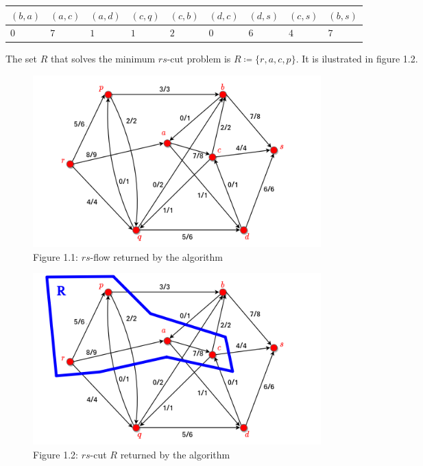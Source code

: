 \documentclass[a4paper,10pt, leqno]{article}
\theoremstyle{definition}
\begin{document}
\bgroup
\def\arraystretch{1.8}
\begin{center}
\begin{tabular}{|m{0.8cm}|m{0.8cm}|m{0.8cm}|m{0.8cm}|m{0.8cm}|m{0.8cm}|m{0.8cm}|m{0.8cm}|m{0.8cm}|}
\hline 
$(b, a)$
& $(a, c)$
& $(a, d)$
& $(c, q)$
& $(c, b)$
& $(d, c)$
& $(d, s)$
& $(c, s)$
& $(b, s)$
\\ \hline
\centering $0$
& \centering $7$
& \centering $1$
& \centering $1$
& \centering $2$
& \centering $0$
& \centering $6$
& \centering $4$
& \centering\arraybackslash $7$
\\ \hline
\end{tabular}
\end{center}
\egroup

The set $R$ that solves the minimum $rs$-cut problem is $R \coloneqq \{r, a, c, p \}$. It is ilustrated in figure 1.2.

\begin{figure}[ht]
\centering
  \includegraphics[width=30em]{flow.png}
  \captionsetup{labelformat=empty}
  \caption{Figure 1.1: $rs$-flow returned by the algorithm}
\end{figure}
\begin{figure}[ht]
\centering
  \includegraphics[width=30em]{cut.png}
  \captionsetup{labelformat=empty}
  \caption{Figure 1.2: $rs$-cut $R$ returned by the algorithm}
\end{figure}
\end{document}
